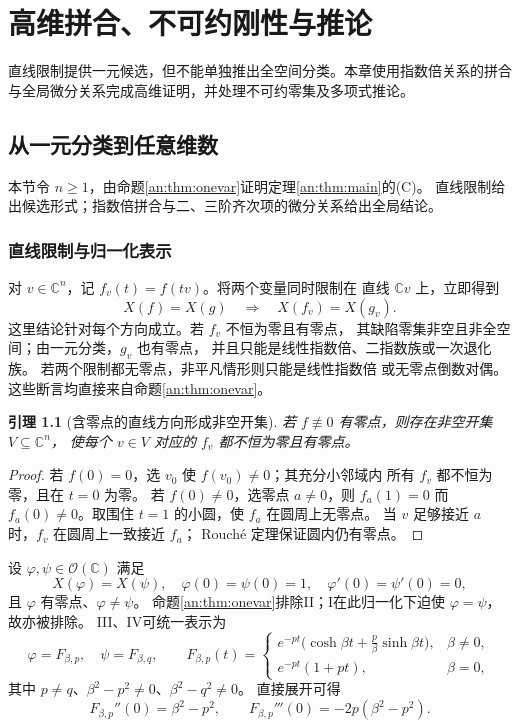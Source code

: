 \documentclass[11pt,a4paper,oneside,openany]{book}
\theoremstyle{lecture}
\newtheorem{lemma}[theorem]{引理}
\newcommand{\C}{\mathbb C}
\newcommand{\OO}{\mathcal O}
\numberwithin{equation}{section}
\begin{document}
\chapter{高维拼合、不可约刚性与推论}\label{ch:highdim}
直线限制提供一元候选，但不能单独推出全空间分类。本章使用指数倍关系的拼合与全局微分关系完成高维证明，并处理不可约零集及多项式推论。
\section{从一元分类到任意维数}\label{an:sec:highdim}
本节令 $n\ge1$，由命题\ref{an:thm:onevar}证明定理\ref{an:thm:main}的(C)。
直线限制给出候选形式；指数倍拼合与二、三阶齐次项的微分关系给出全局结论。

\subsection{直线限制与归一化表示}
对 $v\in\C^n$，记 $f_v(t)=f(tv)$。将两个变量同时限制在
直线 $\C v$ 上，立即得到
\[
 X(f)=X(g)\quad\Longrightarrow\quad X(f_v)=X(g_v).
\]
这里结论针对每个方向成立。若 $f_v$ 不恒为零且有零点，
其缺陷零集非空且非全空间；由一元分类，$g_v$ 也有零点，
并且只能是线性指数倍、二指数族或一次退化族。
若两个限制都无零点，非平凡情形则只能是线性指数倍
或无零点倒数对偶。这些断言均直接来自命题\ref{an:thm:onevar}。

\begin{lemma}[含零点的直线方向形成非空开集]\label{an:lem:directions}
若 $f\not\equiv0$ 有零点，则存在非空开集 $V\subseteq\C^n$，
使每个 $v\in V$ 对应的 $f_v$ 都不恒为零且有零点。
\end{lemma}
\begin{proof}
若 $f(0)=0$，选 $v_0$ 使 $f(v_0)\ne0$；其充分小邻域内
所有 $f_v$ 都不恒为零，且在 $t=0$ 为零。
若 $f(0)\ne0$，选零点 $a\ne0$，则 $f_a(1)=0$ 而
$f_a(0)\ne0$。取围住 $t=1$ 的小圆，使 $f_a$ 在圆周上无零点。
当 $v$ 足够接近 $a$ 时，$f_v$ 在圆周上一致接近 $f_a$；
Rouch\'e 定理保证圆内仍有零点。
\end{proof}

设 $\varphi,\psi\in\OO(\C)$ 满足
\[
 X(\varphi)=X(\psi),\quad
 \varphi(0)=\psi(0)=1,\quad \varphi'(0)=\psi'(0)=0,
\]
且 $\varphi$ 有零点、$\varphi\ne\psi$。
命题\ref{an:thm:onevar}排除II；I在此归一化下迫使 $\varphi=\psi$，故亦被排除。
III、IV可统一表示为
\begin{equation}\label{an:eq:Fbeta}
 \varphi=F_{\beta,p},\quad \psi=F_{\beta,q},\qquad
 F_{\beta,p}(t)=
 \begin{cases}
 e^{-pt}\bigl(\cosh\beta t+\frac p\beta\sinh\beta t\bigr),&\beta\ne0,\\
 e^{-pt}(1+pt),&\beta=0,
 \end{cases}
\end{equation}
其中 $p\ne q$、$\beta^2-p^2\ne0$、$\beta^2-q^2\ne0$。
直接展开可得
\begin{equation}\label{an:eq:Fjets}
 F_{\beta,p}''(0)=\beta^2-p^2,\qquad
 F_{\beta,p}'''(0)=-2p(\beta^2-p^2).
\end{equation}
\end{document}
